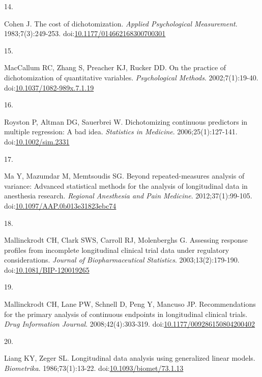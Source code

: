 \documentclass[
  11pt,
]{article}
\newlength{\cslhangindent}
\newlength{\csllabelwidth}
\newenvironment{CSLReferences}[2] %
 {\begin{list}{}{%
  \setlength{\itemindent}{0pt}
  \setlength{\leftmargin}{0pt}
  \setlength{\parsep}{0pt}
  \ifodd #1
   \setlength{\leftmargin}{\cslhangindent}
   \setlength{\itemindent}{-1\cslhangindent}
  \fi
  \setlength{\itemsep}{#2\baselineskip}}}
 {\end{list}}
\newcommand{\CSLLeftMargin}[1]{\parbox[t]{\csllabelwidth}{\strut#1\strut}}
\newcommand{\CSLRightInline}[1]{\parbox[t]{\linewidth - \csllabelwidth}{\strut#1\strut}}
\begin{document}
\begin{CSLReferences}{0}{1}
\CSLLeftMargin{14. }%
\CSLRightInline{Cohen J. The cost of dichotomization. \emph{Applied Psychological Measurement}. 1983;7(3):249-253. doi:\href{https://doi.org/10.1177/014662168300700301}{10.1177/014662168300700301}}

\CSLLeftMargin{15. }%
\CSLRightInline{MacCallum RC, Zhang S, Preacher KJ, Rucker DD. On the practice of dichotomization of quantitative variables. \emph{Psychological Methods}. 2002;7(1):19-40. doi:\href{https://doi.org/10.1037/1082-989x.7.1.19}{10.1037/1082-989x.7.1.19}}

\CSLLeftMargin{16. }%
\CSLRightInline{Royston P, Altman DG, Sauerbrei W. Dichotomizing continuous predictors in multiple regression: A bad idea. \emph{Statistics in Medicine}. 2006;25(1):127-141. doi:\href{https://doi.org/10.1002/sim.2331}{10.1002/sim.2331}}

\CSLLeftMargin{17. }%
\CSLRightInline{Ma Y, Mazumdar M, Memtsoudis SG. Beyond repeated-measures analysis of variance: Advanced statistical methods for the analysis of longitudinal data in anesthesia research. \emph{Regional Anesthesia and Pain Medicine}. 2012;37(1):99-105. doi:\href{https://doi.org/10.1097/AAP.0b013e31823ebc74}{10.1097/AAP.0b013e31823ebc74}}

\CSLLeftMargin{18. }%
\CSLRightInline{Mallinckrodt CH, Clark SWS, Carroll RJ, Molenberghs G. Assessing response profiles from incomplete longitudinal clinical trial data under regulatory considerations. \emph{Journal of Biopharmaceutical Statistics}. 2003;13(2):179-190. doi:\href{https://doi.org/10.1081/BIP-120019265}{10.1081/BIP-120019265}}

\CSLLeftMargin{19. }%
\CSLRightInline{Mallinckrodt CH, Lane PW, Schnell D, Peng Y, Mancuso JP. Recommendations for the primary analysis of continuous endpoints in longitudinal clinical trials. \emph{Drug Information Journal}. 2008;42(4):303-319. doi:\href{https://doi.org/10.1177/009286150804200402}{10.1177/009286150804200402}}

\CSLLeftMargin{20. }%
\CSLRightInline{Liang KY, Zeger SL. Longitudinal data analysis using generalized linear models. \emph{Biometrika}. 1986;73(1):13-22. doi:\href{https://doi.org/10.1093/biomet/73.1.13}{10.1093/biomet/73.1.13}}


\end{CSLReferences}
\end{document}
